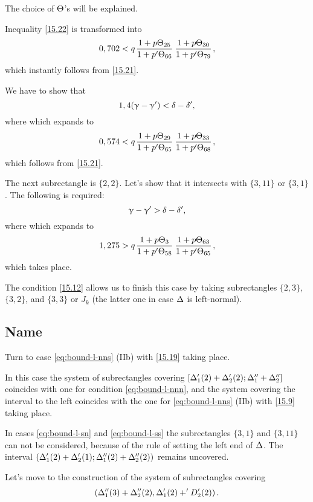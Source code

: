 The choice of $\Theta$'s will be explained.

Inequality \ref{15.22} is transformed into
\begin{equation*}
	0,702 < q \up{25}{66} \up{30}{79},
\end{equation*}
which instantly follows from \ref{15.21}.

We have to show that
\begin{equation*}
	1,4 (\upgamma - \upgamma') < \delta - \delta',
\end{equation*}
where
which expands to
\begin{equation*}
	0,574 < q \up{29}{65} \up{33}{68},
\end{equation*}
which follows from \ref{15.21}.

The next subrectangle is $\{2, 2\}$.
Let's show that it intersects with $\{3, 11\}$ or $\{3, 1\}$.
The following is required:
\begin{equation}\label{15.25}
	\upgamma - \upgamma' > \delta - \delta',
\end{equation}
where
which expands to
\begin{equation*}
	1,275 > q \up{3}{58} \up{63}{65},
\end{equation*}
which takes place.

The condition \ref{15.12} allows us to finish this case
by taking subrectangles $\{2, 3\}$, $\{3, 2\}$, and $\{3, 3\}$ or $J_k$
(the latter one in case $\Delta$ is left-normal).

\subsection{Name}

Turn to case \ref{eq:bound-l-nns} (IIb) with \ref{15.19} taking place.

In this case the system of subrectangles covering $\left[\Delta_1'(2) + \Delta_2'(2); \Delta_1'' + \Delta_2''\right]$
coincides with one for condition \ref{eq:bound-l-nnn},
and the system covering the interval to the left
coincides with the one for \ref{eq:bound-l-nns} (IIb) with \ref{15.9} taking place.

In cases \ref{eq:bound-l-sn} and \ref{eq:bound-l-ss}
the subrectangles $\{3, 1\}$ and $\{3, 11\}$
can not be considered, because of the rule of setting the left end of $\Delta$.
The interval $\left(\Delta_1'(2) + \Delta_2'(1); \Delta_1''(2) + \Delta_2''(2)\right)$ remains uncovered.

Let's move to the construction of the system of subrectangles covering
\begin{equation}\label{15.26}
	\left(\Delta_1''(3) + \Delta_2''(2), \Delta_1'(2) + 'D_2'(2)\right).
\end{equation}

